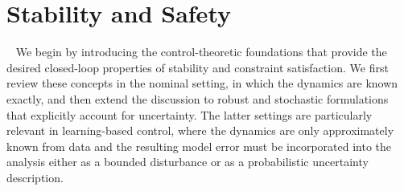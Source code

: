 \section{Stability and Safety}
~\label{sec:safety}
We begin by introducing the control-theoretic foundations that provide the desired closed-loop properties of stability and constraint satisfaction. We first review these concepts in the nominal setting, in which the dynamics are known exactly, and then extend the discussion to robust and stochastic formulations that explicitly account for uncertainty. The latter settings are particularly relevant in learning-based control, where the dynamics are only approximately known from data and the resulting model error must be incorporated into the analysis either as a bounded disturbance or as a probabilistic uncertainty description. 


